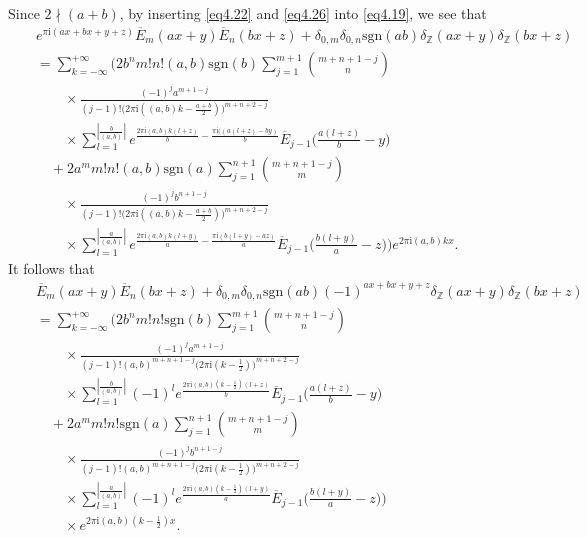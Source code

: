 \documentclass[reqno]{amsart}
\numberwithin{equation}{section}
\begin{document}
 Since $2\nmid(a+b)$, by inserting \eqref{eq4.22} and \eqref{eq4.26} into \eqref{eq4.19}, we see that
\begin{eqnarray*}
&&e^{\pi\mathrm{i}(ax+bx+y+z)}\overline{E}_{m}(ax+y)\overline{E}_{n}(bx+z)+\delta_{0,m}\delta_{0,n}\mathrm{sgn}(ab)\delta_{\mathbb{Z}}(ax+y)\delta_{\mathbb{Z}}(bx+z)\nonumber\\
&&=\sum_{k=-\infty}^{+\infty}\biggl(2b^{n}m!n!(a,b)\mathrm{sgn}(b)
\sum_{j=1}^{m+1}\binom{m+n+1-j}{n}\nonumber\\
&&\qquad\times\frac{(-1)^{j}a^{m+1-j}}{(j-1)!\bigl(2\pi\mathrm{i}((a,b)k-\frac{a+b}{2})\bigl)^{m+n+2-j}}\nonumber\\
&&\qquad\times\sum_{l=1}^{|\frac{b}{(a,b)}|}e^{\frac{2\pi\mathrm{i}(a,b)k(l+z)}{b}-\frac{\pi\mathrm{i}((a(l+z)-by)}{b}}
\overline{E}_{j-1}\biggl(\frac{a(l+z)}{b}-y\biggl)\nonumber\\
&&\quad+2a^{m}m!n!(a,b)\mathrm{sgn}(a)\sum_{j=1}^{n+1}\binom{m+n+1-j}{m}\nonumber\\
&&\qquad\times\frac{(-1)^{j}b^{n+1-j}}{(j-1)!\bigl(2\pi\mathrm{i}((a,b)k-\frac{a+b}{2})\bigl)^{m+n+2-j}}\nonumber\\
&&\qquad\times\sum_{l=1}^{|\frac{a}{(a,b)}|}e^{\frac{2\pi\mathrm{i}(a,b)k(l+y)}{a}-\frac{\pi\mathrm{i}(b(l+y)-az)}{a}}
\overline{E}_{j-1}\biggl(\frac{b(l+y)}{a}-z\biggl)\biggl)e^{2\pi\mathrm{i}(a,b)kx}.
\end{eqnarray*}
It follows that
\begin{eqnarray}\label{eq4.30}
&&\overline{E}_{m}(ax+y)\overline{E}_{n}(bx+z)+\delta_{0,m}\delta_{0,n}\mathrm{sgn}(ab)(-1)^{ax+bx+y+z}\delta_{\mathbb{Z}}(ax+y)\delta_{\mathbb{Z}}(bx+z)\nonumber\\
&&=\sum_{k=-\infty}^{+\infty}\biggl(2b^{n}m!n!\mathrm{sgn}(b)
\sum_{j=1}^{m+1}\binom{m+n+1-j}{n}\nonumber\\
&&\qquad\times\frac{(-1)^{j}a^{m+1-j}}{(j-1)!(a,b)^{m+n+1-j}\bigl(2\pi\mathrm{i}(k-\frac{1}{2})\bigl)^{m+n+2-j}}\nonumber\\
&&\qquad\times\sum_{l=1}^{|\frac{b}{(a,b)}|}(-1)^{l}e^{\frac{2\pi\mathrm{i}(a,b)(k-\frac{1}{2})(l+z)}{b}}
\overline{E}_{j-1}\biggl(\frac{a(l+z)}{b}-y\biggl)\nonumber\\
&&\quad+2a^{m}m!n!\mathrm{sgn}(a)\sum_{j=1}^{n+1}\binom{m+n+1-j}{m}\nonumber\\
&&\qquad\times\frac{(-1)^{j}b^{n+1-j}}{(j-1)!(a,b)^{m+n+1-j}\bigl(2\pi\mathrm{i}(k-\frac{1}{2})\bigl)^{m+n+2-j}}\nonumber\\
&&\qquad\times\sum_{l=1}^{|\frac{a}{(a,b)}|}(-1)^{l}e^{\frac{2\pi\mathrm{i}(a,b)(k-\frac{1}{2})(l+y)}{a}}
\overline{E}_{j-1}\biggl(\frac{b(l+y)}{a}-z\biggl)\biggl)\nonumber\\
&&\qquad\times e^{2\pi\mathrm{i}(a,b)(k-\frac{1}{2})x}.
\end{eqnarray}
\end{document}
